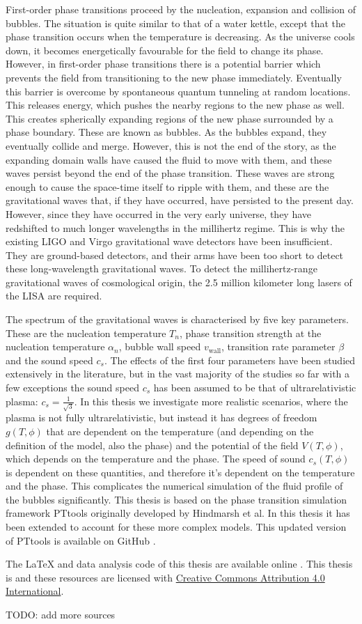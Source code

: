 First-order phase transitions proceed by the nucleation, expansion and collision of bubbles.
The situation is quite similar to that of a water kettle,
except that the phase transition occurs when the temperature is decreasing.
As the universe cools down,
it becomes energetically favourable for the field to change its phase.
However, in first-order phase transitions there is a potential barrier which prevents the field from transitioning to the new phase immediately.
Eventually this barrier is overcome by spontaneous quantum tunneling at random locations.
This releases energy, which pushes the nearby regions to the new phase as well.
This creates spherically expanding regions of the new phase surrounded by a phase boundary.
These are known as bubbles.
As the bubbles expand, they eventually collide and merge.
However, this is not the end of the story,
as the expanding domain walls have caused the fluid to move with them,
and these waves persist beyond the end of the phase transition.
These waves are strong enough to cause the space-time itself to ripple with them,
and these are the gravitational waves that, if they have occurred, have persisted to the present day.
However, since they have occurred in the very early universe, they have redshifted to much longer wavelengths in the millihertz regime.
This is why the existing LIGO and Virgo gravitational wave detectors have been insufficient.
They are ground-based detectors, and their arms have been too short to detect these long-wavelength gravitational waves.
To detect the millihertz-range gravitational waves of cosmological origin, the 2.5 million kilometer long lasers of the LISA are required.
\cite{lecture_notes}

The spectrum of the gravitational waves is characterised by five key parameters.
These are the nucleation temperature $T_n$,
phase transition strength at the nucleation temperature $\alpha_n$,
bubble wall speed $v_{\text{wall}}$,
transition rate parameter $\beta$
and the sound speed $c_s$.
\cite{lecture_notes}
The effects of the first four parameters have been studied extensively in the literature,
but in the vast majority of the studies so far with a few exceptions
\cites{giese_2020}{giese_2021}{tenkanen_speed_2022}{tian_gw_2024}
the sound speed $c_s$ has been assumed to be that of ultrarelativistic plasma: $c_s = \frac{1}{\sqrt{3}}$.
In this thesis we investigate more realistic scenarios, where the plasma is not fully ultrarelativistic,
but instead it has degrees of freedom $g(T,\phi)$ that are dependent on the temperature (and depending on the definition of the model, also the phase) and the potential of the field $V(T,\phi)$,
which depends on the temperature and the phase.
The speed of sound $c_s(T,\phi)$ is dependent on these quantities,
and therefore it's dependent on the temperature and the phase.
This complicates the numerical simulation of the fluid profile of the bubbles significantly.
This thesis is based on the phase transition simulation framework PTtools originally developed by Hindmarsh et al.
In this thesis it has been extended to account for these more complex models.
This updated version of PTtools is available on GitHub \cite{pttools}.

The LaTeX and data analysis code of this thesis are available online \cite{thesis_source}.
This thesis is and these resources are licensed with
\href{https://creativecommons.org/licenses/by/4.0/}{Creative Commons Attribution 4.0 International}.

TODO: add more sources
